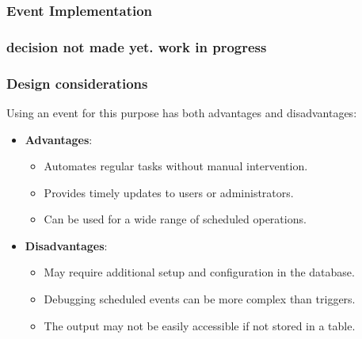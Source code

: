 \hypertarget{event-implementation}{%
\subsubsection{Event Implementation}\label{event-implementation}}

\begin{Shaded}
\begin{Highlighting}[]

\end{Highlighting}
\end{Shaded}

\hypertarget{decision-not-made-yet.-work-in-progress}{%
\subsubsection{decision not made yet. work in
progress}\label{decision-not-made-yet.-work-in-progress}}

\hypertarget{design-considerations-1}{%
\subsubsection{Design considerations}\label{design-considerations-1}}

Using an event for this purpose has both advantages and disadvantages:

\begin{itemize}
\tightlist
\item
  \textbf{Advantages}:

  \begin{itemize}
  \tightlist
  \item
    Automates regular tasks without manual intervention.
  \item
    Provides timely updates to users or administrators.
  \item
    Can be used for a wide range of scheduled operations.
  \end{itemize}
\item
  \textbf{Disadvantages}:

  \begin{itemize}
  \tightlist
  \item
    May require additional setup and configuration in the database.
  \item
    Debugging scheduled events can be more complex than triggers.
  \item
    The output may not be easily accessible if not stored in a table.
  \end{itemize}
\end{itemize}

